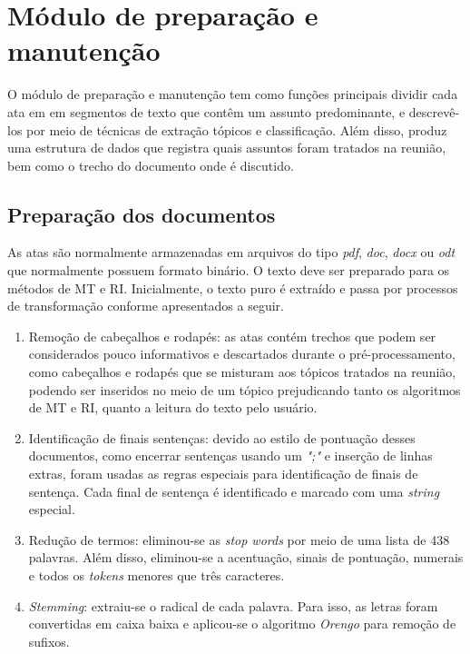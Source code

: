 \section{Módulo de preparação e manutenção}

O módulo de preparação e manutenção tem como funções principais dividir cada ata em em segmentos de texto que contêm um assunto predominante, e descrevê-los por meio de técnicas de extração tópicos e classificação. Além disso, produz uma estrutura de dados que registra quais assuntos foram tratados na reunião, bem como o trecho do documento onde é discutido.


\subsection{Preparação dos documentos}

As atas são normalmente armazenadas em arquivos do tipo \textit{pdf}, \textit{doc}, \textit{docx} ou \textit{odt} que normalmente possuem formato binário.
O texto deve ser preparado para os métodos de MT e RI. Inicialmente, o texto puro é extraído e passa por processos de transformação conforme apresentados a seguir.


\begin{enumerate}

\item Remoção de cabeçalhos e rodapés: as atas contém trechos que podem ser considerados pouco informativos e descartados durante o pré-processamento, como cabeçalhos e rodapés que se misturam aos tópicos tratados na reunião, podendo ser  inseridos no meio de um tópico prejudicando tanto os algoritmos de MT e RI, quanto a leitura do texto pelo usuário.

\item Identificação de finais sentenças: devido ao estilo de pontuação desses documentos, como encerrar sentenças usando um \textit{";"} e inserção de linhas extras, foram usadas as regras especiais para identificação de finais de sentença. Cada final de sentença é identificado e marcado com uma \textit{string} especial.%




\item Redução de termos: eliminou-se as \textit{stop words} por meio de uma lista de 438 palavras. Além disso, eliminou-se a acentuação, sinais de pontuação, numerais e todos os \textit{tokens} menores que três caracteres. 

\item \textit{Stemming}: extraiu-se o radical de cada palavra. Para isso, as letras foram convertidas em caixa baixa e aplicou-se o algoritmo \textit{Orengo}%
	para remoção de sufixos.

\end{enumerate}
	

